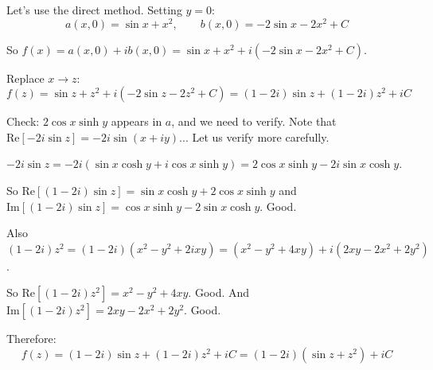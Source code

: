 \documentclass[12pt]{article}
\begin{document}
Let's use the direct method. Setting $y = 0$:
\[
a(x,0) = \sin x + x^2, \qquad b(x,0) = -2\sin x - 2x^2 + C
\]

So $f(x) = a(x,0) + ib(x,0) = \sin x + x^2 + i(-2\sin x - 2x^2 + C)$.

Replace $x \to z$:
\[
f(z) = \sin z + z^2 + i(-2\sin z - 2z^2 + C) = (1 - 2i)\sin z + (1 - 2i)z^2 + iC
\]

Check: $2\cos x\sinh y$ appears in $a$, and we need to verify. Note that $\text{Re}[-2i\sin z] = -2i\sin(x+iy)$... Let us verify more carefully.

$-2i\sin z = -2i(\sin x\cosh y + i\cos x\sinh y) = 2\cos x\sinh y - 2i\sin x\cosh y$.

So $\text{Re}[(1-2i)\sin z] = \sin x\cosh y + 2\cos x\sinh y$ and $\text{Im}[(1-2i)\sin z] = \cos x\sinh y - 2\sin x\cosh y$. Good.

Also $(1-2i)z^2 = (1-2i)(x^2-y^2+2ixy) = (x^2-y^2+4xy) + i(2xy - 2x^2 + 2y^2)$.

So $\text{Re}[(1-2i)z^2] = x^2-y^2+4xy$. Good. And $\text{Im}[(1-2i)z^2] = 2xy-2x^2+2y^2$. Good.

Therefore:
\[
\boxed{f(z) = (1-2i)\sin z + (1-2i)z^2 + iC = (1-2i)(\sin z + z^2) + iC}
\]
\end{document}
